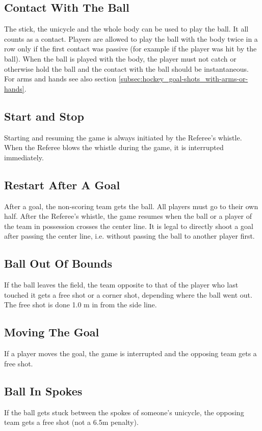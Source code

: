 \subsection{Contact With The Ball}
The stick, the unicycle and the whole body can be used to play the ball.
It all counts as a contact.
Players are allowed to play the ball with the body twice in a row only if the first contact was passive (for example if the player was hit by the ball).
When the ball is played with the body, the player must not catch or otherwise hold the ball and the contact with the ball should be instantaneous.
For arms and hands see also section \ref{subsec:hockey_goal-shots_with-arms-or-hands}.

\subsection{Start and Stop}
Starting and resuming the game is always initiated by the Referee's whistle.
When the Referee blows the whistle during the game, it is interrupted immediately.

\subsection{Restart After A Goal}
After a goal, the non-scoring team gets the ball.
All players must go to their own half.
After the Referee's whistle, the game resumes when the ball or a player of the team in possession crosses the center line.
It is legal to directly shoot a goal after passing the center line, i.e. without passing the ball to another player first.

\subsection{Ball Out Of Bounds}
If the ball leaves the field, the team opposite to that of the player who last touched it gets a free shot or a corner shot, depending where the ball went out.
The free shot is done 1.0 m in from the side line.

\subsection{Moving The Goal}
If a player moves the goal, the game is interrupted and the opposing team gets a free shot.

\subsection{Ball In Spokes}
If the ball gets stuck between the spokes of someone's unicycle, the opposing team gets a free shot (not a 6.5m penalty).


